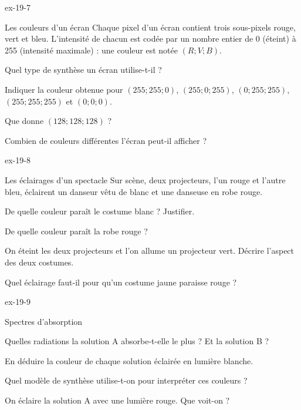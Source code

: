 \begin{blocLivre}{ex-19-7}
\begin{exercice}[2]{Les couleurs d'un écran}
Chaque pixel d'un écran contient trois sous-pixels rouge, vert et bleu. L'intensité de chacun est codée par un nombre entier de 0 (éteint)
à 255 (intensité maximale) : une couleur est notée $(R ; V ; B)$.
\begin{questions}
\item Quel type de synthèse un écran utilise-t-il ?
\item Indiquer la couleur obtenue pour $(255 ; 255 ; 0)$, $(255 ; 0 ; 255)$, $(0 ; 255 ; 255)$, $(255 ; 255 ; 255)$ et $(0 ; 0 ; 0)$.
\item Que donne $(128 ; 128 ; 128)$ ?
\item Combien de couleurs différentes l'écran peut-il afficher ?
\end{questions}
\end{exercice}
\end{blocLivre}
\begin{blocLivre}{ex-19-8}
\begin{exercice}[2]{Les éclairages d'un spectacle}
Sur scène, deux projecteurs, l'un rouge et l'autre bleu, éclairent un danseur vêtu de blanc et une danseuse en robe rouge.
\begin{questions}
\item De quelle couleur paraît le costume blanc ? Justifier.
\item De quelle couleur paraît la robe rouge ?
\item On éteint les deux projecteurs et l'on allume un projecteur vert. Décrire l'aspect des deux costumes.
\item Quel éclairage faut-il pour qu'un costume jaune paraisse rouge ?
\end{questions}
\end{exercice}
\end{blocLivre}
\begin{blocLivre}{ex-19-9}
\begin{exercice}[2]{Spectres d'absorption}
\begin{questions}
\item Quelles radiations la solution A absorbe-t-elle le plus ? Et la solution B ?
\item En déduire la couleur de chaque solution éclairée en lumière blanche.
\item Quel modèle de synthèse utilise-t-on pour interpréter ces couleurs ?
\item On éclaire la solution A avec une lumière rouge. Que voit-on ?
\end{questions}
\end{exercice}
\end{blocLivre}
